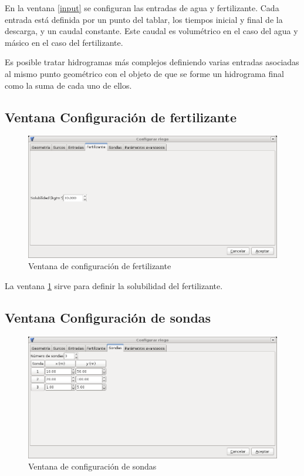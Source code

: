 En la ventana \ref{input} se configuran las entradas de agua y fertilizante. Cada entrada está definida por un punto del tablar, los tiempos inicial y final de la descarga, y un caudal constante. Este caudal es  volumétrico en el caso del agua y másico en el caso del fertilizante.

Es posible tratar hidrogramas más complejos definiendo varias entradas asociadas al mismo punto geométrico con el objeto de que se forme un hidrograma final como la suma de cada uno de ellos. 


\subsection{Ventana Configuración de fertilizante}

\begin{figure}[!h]
\begin{center}
\includegraphics*[width=\textwidth]{images/confFerti.png}
\qquad
\caption{Ventana de configuración de fertilizante}\label{ferti}
\end{center}
\end{figure}

La ventana \ref{ferti} sirve para definir la solubilidad del fertilizante. 

\subsection{Ventana Configuración de sondas}

\begin{figure}[!h]
\begin{center}
\includegraphics*[width=\textwidth]{images/confSondas.png}
\qquad
\caption{Ventana de configuración de sondas}\label{sondas}
\end{center}
\end{figure}

